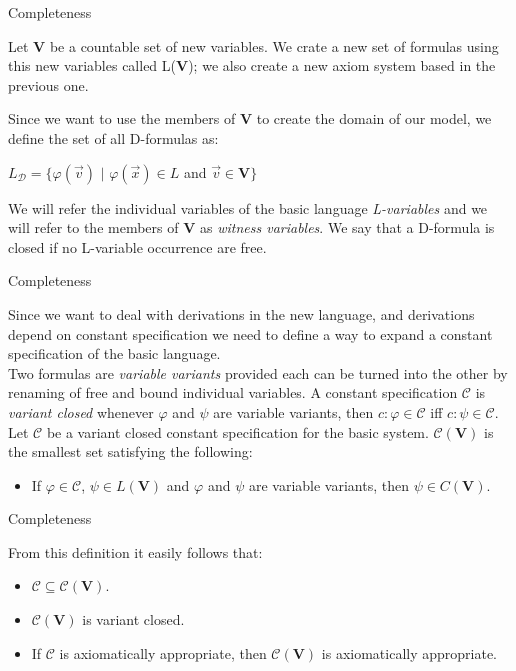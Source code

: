\documentclass{beamer}
\theoremstyle{definition}
\newcommand{\C}{\mathcal{C}}
\newcommand{\D}{\mathcal{D}}
\begin{document}
\begin{frame}{Completeness}

\qquad Let \textbf{V} be a countable set of new variables. We crate a new set of formulas using this new variables called L(\textbf{V}); we also create a new axiom system based in the previous one.

\qquad Since we want to use the members of \textbf{V} to create the domain of our model, we define the set of all D-formulas as:

\begin{center}
	$L_{\D} = \{\varphi (\vec{v})$ $|$  $\varphi(\vec{x}) \in L$ and $\vec{v} \in \textbf{V}\}$
\end{center}

\qquad We will refer the individual variables of the basic language \textit{L-variables} and we will refer to the members of \textbf{V} as \textit{witness variables}. We say that a D-formula is closed if no L-variable occurrence are free. 
	
\end{frame}



\begin{frame}{Completeness}

\qquad Since we want to deal with derivations in the new language, and derivations depend on constant specification we need to define a way to expand a constant specification of the basic language.\\
\vspace{5mm} 	
\qquad Two formulas are \textit{variable variants} provided each can be turned into the other by renaming of free and bound individual variables. A constant specification $\C$ is \textit{variant closed} whenever $\varphi$ and $\psi$ are variable variants, then $c$$:$$\varphi \in \C$ iff $c$$:$$\psi \in \C$.	\\
\vspace{5mm} 		
\qquad Let $\C$ be a variant closed constant specification for the basic system. $\C(\textbf{V})$ is the smallest set satisfying the following:

\begin{itemize}
\item If $\varphi \in \C$, $\psi \in L(\textbf{V})$ and $\varphi$ and $\psi$ are variable variants, then $\psi \in C(\textbf{V})$.
\end{itemize}
\end{frame}

	
\begin{frame}{Completeness}


\qquad From this definition it easily follows that:
\begin{itemize}
	\item $\C \subseteq \C(\textbf{V})$.
	\item $\C(\textbf{V})$ is variant closed.
	\item If $\C$ is axiomatically appropriate, then $\C(\textbf{V})$ is axiomatically appropriate.
\end{itemize}	

\end{frame}		
		
\end{document}

